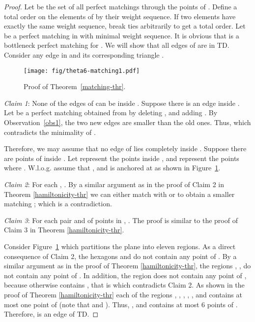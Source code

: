 \documentclass[11pt,a4paper]{article}
\newcommand{\kTD}[2]{\text{-}TD#2}
\begin{document}
\begin{proof}
Let  be the set of all perfect matchings through the points of . Define a total order on the elements of  by their weight sequence. If two elements have exactly the same weight sequence, break ties arbitrarily to get a total order.
Let  be a perfect matching in  with minimal weight sequence. It is obvious that  is a bottleneck perfect matching for . We will show that all edges of  are in \kTD{6}{}. Consider any edge  in  and its corresponding triangle .


\begin{figure}[htb]
  \centering
  \texttt{[image: fig/theta6-matching1.pdf]}
 \caption{Proof of Theorem~\ref{matching-thr}.}
  \label{matching-fig1}
\end{figure}

{\em Claim 1}: None of the edges of  can be inside . Suppose there is an edge  inside . Let  be a perfect matching obtained from  by deleting , and adding . By Observation~\ref{obs1}, the two new edges are smaller than the old ones. Thus,  which contradicts the minimality of .

Therefore, we may assume that no edge of  lies completely inside . Suppose there are  points of  inside . Let  represent the points inside , and  represent the points where . W.l.o.g. assume that , and  is anchored at  as shown in Figure~\ref{matching-fig1}.  

{\em Claim 2}: For each , . By a similar argument as in the proof of Claim 2 in Theorem \ref{hamiltonicity-thr} we can either match  with  or  to obtain a smaller matching ; which is a contradiction.

{\em Claim 3}: For each pair  and  of points in , . The proof is similar to the proof of Claim 3 in Theorem \ref{hamiltonicity-thr}.

Consider Figure~\ref{matching-fig1} which partitions the plane into eleven regions. As a direct consequence of Claim 2, the hexagons  and  do not contain any point of . By a similar argument as in the proof of Theorem \ref{hamiltonicity-thr}, the regions , ,  do not contain any point of . In addition, the region  does not contain any point  of , because otherwise  contains , that is  which contradicts Claim 2. As shown in the proof of Theorem \ref{hamiltonicity-thr} each of the regions , , , , , and  contains at most one point of  (note that  and ). Thus, , and  contains at most 6 points of . Therefore,  is an edge of \kTD{6}{}.
\end{proof}
\end{document}
